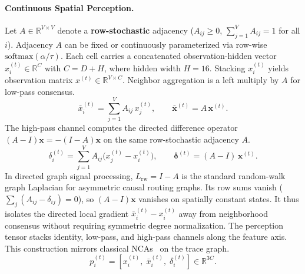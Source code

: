 \documentclass[10pt,twocolumn,letterpaper]{article}
\begin{document}
\paragraph{Continuous Spatial Perception.}
Let $A \in \mathbb{R}^{V \times V}$ denote a \textbf{row-stochastic} adjacency ($A_{ij} \ge 0$, $\sum_{j=1}^V A_{ij} = 1$ for all $i$). Adjacency $A$ can be fixed or continuously parameterized via row-wise $\mathrm{softmax}(\alpha/\tau)$. Each cell carries a concatenated observation-hidden vector $x_i^{(t)} \in \mathbb{R}^{C}$ with $C = D + H$, where hidden width $H{=}16$. Stacking $x_i^{(t)}$ yields observation matrix $x^{(t)} \in \mathbb{R}^{V \times C}$. Neighbor aggregation is a left multiply by $A$ for low-pass consensus.
\begin{equation}\label{eq:gnca-lowpass}
  \bar{x}_i^{(t)} = \sum_{j=1}^V A_{ij}\, x_j^{(t)}, \qquad \bar{\mathbf{x}}^{(t)} = A\,\mathbf{x}^{(t)}.
\end{equation}
The high-pass channel computes the directed difference operator $(A - I)\mathbf{x} = -(I - A)\mathbf{x}$ on the same row-stochastic adjacency $A$.
\begin{equation}\label{eq:gnca-highpass}
  \delta_i^{(t)} = \sum_{j=1}^V A_{ij}\bigl(x_j^{(t)} - x_i^{(t)}\bigr), \qquad \boldsymbol{\delta}^{(t)} = (A - I)\,\mathbf{x}^{(t)}.
\end{equation}
In directed graph signal processing, $L_{\text{rw}} = I - A$ is the standard random-walk graph Laplacian for asymmetric causal routing graphs. Its row sums vanish ($\sum_j (A_{ij} - \delta_{ij}) = 0$), so $(A - I)\mathbf{x}$ vanishes on spatially constant states. It thus isolates the directed local gradient $\bar{x}_i^{(t)} - x_i^{(t)}$ away from neighborhood consensus without requiring symmetric degree normalization.
The perception tensor stacks identity, low-pass, and high-pass channels along the feature axis. This construction mirrors classical NCAs~\cite{mordvintsev2020growing} on the trace graph.
\begin{equation}\label{eq:gnca-perceive}
  p_i^{(t)} = \left[ x_i^{(t)}, \; \bar{x}_i^{(t)}, \; \delta_i^{(t)} \right] \in \mathbb{R}^{3C}.
\end{equation}
\end{document}
